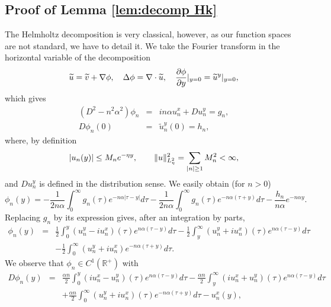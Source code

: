 \documentclass[11pt]{article}
\begin{document}
\subsection{Proof of Lemma \protect\ref{lem:decomp Hk}\label{App:decompHk}}




The Helmholtz decomposition is very classical, however, as our function spaces are not standard,
we have to detail it. We take the Fourier transform in the horizontal variable of the decomposition 
\begin{align*}
\widetilde{u} =\widetilde{v}+\nabla \phi , \quad
\Delta \phi =\nabla \cdot \widetilde{u}, \quad \frac{\partial \phi }{%
\partial y}|_{y=0}=\widetilde{u}^{y}|_{y=0},
\end{align*}%
which gives
\begin{eqnarray*}
(D^{2}-n^{2}\alpha ^{2})\phi _{n} &=&in\alpha u_{n}^{x}+Du_{n}^{y}=g_{n}, \\
D\phi _{n}(0) &=&\widetilde{u}_{n}^{y}(0)=h_{n},
\end{eqnarray*}%
where, by definition%
\begin{eqnarray}
|u_{n}(y)| \leq M_{n}e^{-\eta y},  \qquad \label{estim u n}
\|u\|_{L_{\eta}^{2}}^{2} =\sum_{|n|\geq 1}M_{n}^{2}<\infty ,  \notag
\end{eqnarray}%
and $Du_{n}^{y}$ is defined in the distribution sense. We easily obtain  (for $n>0$) 
\begin{equation*}
\phi _{n}(y)=-\frac{1}{2n\alpha }\int_{0}^{\infty }g_{n}(\tau )e^{-n\alpha
|\tau -y|}d\tau -\frac{1}{2n\alpha }\int_{0}^{\infty }g_{n}(\tau
)e^{-n\alpha (\tau +y)}d\tau -\frac{h_{n}}{n\alpha }e^{-n\alpha y}.
\end{equation*}%
Replacing $g_{n}$ by its expression gives, after an integration by parts,
\begin{eqnarray*}
\phi _{n}(y) &=&\frac{1}{2}\int_{0}^{y}(u_{n}^{y}-iu_{n}^{x})(\tau
)e^{n\alpha (\tau -y)}d\tau -\frac{1}{2}\int_{y}^{\infty
}(u_{n}^{y}+iu_{n}^{x})(\tau )e^{n\alpha (\tau -y)}d\tau \\
&&-\frac{1}{2}\int_{0}^{\infty }(u_{n}^{y}+iu_{n}^{x})e^{-n\alpha (\tau
+y)}d\tau .
\end{eqnarray*}%
We observe that $\phi _{n}\in C^{1}( \mathbb{R} ^{+})$ with%
\begin{eqnarray*}
D\phi _{n}(y) &=&\frac{\alpha n}{2}\int_{0}^{y}(iu_{n}^{x}-u_{n}^{y})(\tau
)e^{n\alpha (\tau -y)}d\tau -\frac{\alpha n}{2}\int_{y}^{\infty
}(iu_{n}^{x}+u_{n}^{y})(\tau )e^{n\alpha (\tau -y)}d\tau \\
&&+\frac{\alpha n}{2}\int_{0}^{\infty }(u_{n}^{y}+iu_{n}^{x})(\tau
)e^{- n\alpha (\tau +y)}d\tau -u_{n}^{x}(y),
\end{eqnarray*}%
\end{document}
